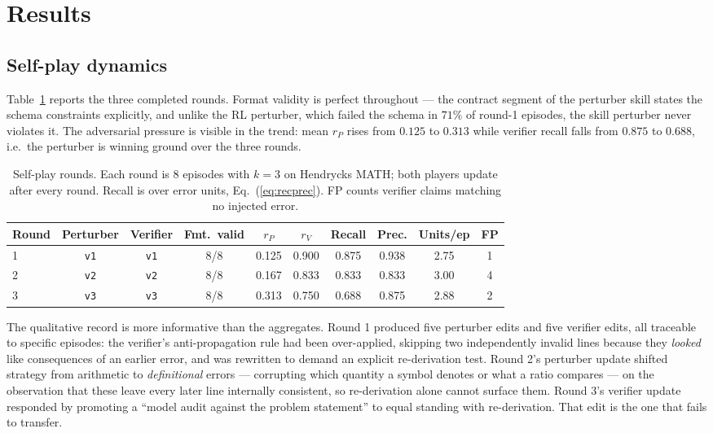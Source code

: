 \documentclass{article} %
\begin{document}
\section{Results}
\label{sec:results}

\subsection{Self-play dynamics}

Table~\ref{tab:selfplay} reports the three completed rounds. Format validity is perfect
throughout --- the contract segment of the perturber skill states the schema constraints
explicitly, and unlike the RL perturber, which failed the schema in $71\%$ of round-1
episodes, the skill perturber never violates it. The adversarial pressure is visible in the
trend: mean $r_P$ rises from $0.125$ to $0.313$ while verifier recall falls from $0.875$ to
$0.688$, i.e.\ the perturber is winning ground over the three rounds.

\begin{table}[t]
\caption{Self-play rounds. Each round is 8 episodes with $k = 3$ on Hendrycks MATH; both
players update after every round. Recall is over error units, Eq.~(\ref{eq:recprec}).
FP counts verifier claims matching no injected error.}
\label{tab:selfplay}
\begin{center}
\small
\begin{tabular}{lccccccccc}
\toprule
Round & Perturber & Verifier & Fmt.\ valid & $r_P$ & $r_V$ & Recall & Prec. & Units/ep & FP \\
\midrule
1 & \texttt{v1} & \texttt{v1} & 8/8 & 0.125 & 0.900 & 0.875 & 0.938 & 2.75 & 1 \\
2 & \texttt{v2} & \texttt{v2} & 8/8 & 0.167 & 0.833 & 0.833 & 0.833 & 3.00 & 4 \\
3 & \texttt{v3} & \texttt{v3} & 8/8 & 0.313 & 0.750 & 0.688 & 0.875 & 2.88 & 2 \\
\bottomrule
\end{tabular}
\end{center}
\end{table}

The qualitative record is more informative than the aggregates. Round 1 produced five
perturber edits and five verifier edits, all traceable to specific episodes: the verifier's
anti-propagation rule had been over-applied, skipping two independently invalid lines
because they \emph{looked} like consequences of an earlier error, and was rewritten to
demand an explicit re-derivation test. Round 2's perturber update shifted strategy from
arithmetic to \emph{definitional} errors --- corrupting which quantity a symbol denotes or
what a ratio compares --- on the observation that these leave every later line internally
consistent, so re-derivation alone cannot surface them. Round 3's verifier update responded
by promoting a ``model audit against the problem statement'' to equal standing with
re-derivation. That edit is the one that fails to transfer.
\end{document}
